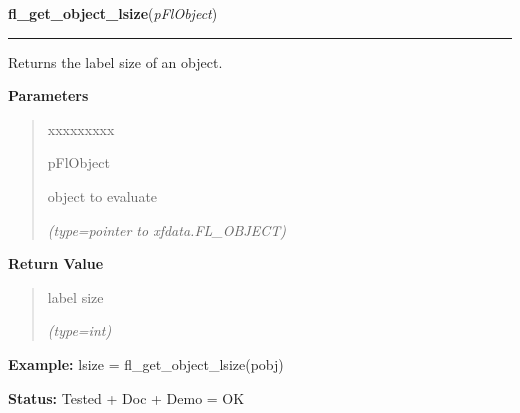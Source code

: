     \vspace{0.5ex}

\hspace{.8\funcindent}\begin{boxedminipage}{\funcwidth}

    \raggedright \textbf{fl\_get\_object\_lsize}(\textit{pFlObject})

    \vspace{-1.5ex}

    \rule{\textwidth}{0.5\fboxrule}
\setlength{\parskip}{2ex}
    Returns the label size of an object.

\setlength{\parskip}{1ex}
      \textbf{Parameters}
      \vspace{-1ex}

      \begin{quote}
        \begin{Ventry}{xxxxxxxxx}

          \item[pFlObject]

          object to evaluate

            {\it (type=pointer to xfdata.FL\_OBJECT)}

        \end{Ventry}

      \end{quote}

      \textbf{Return Value}
    \vspace{-1ex}

      \begin{quote}
      label size

      {\it (type=int)}

      \end{quote}

\textbf{Example:} lsize = fl\_get\_object\_lsize(pobj)



\textbf{Status:} Tested + Doc + Demo = OK



    \end{boxedminipage}

    \label{xformslib:flbasic:fl_set_object_lstyle}

    \vspace{0.5ex}

